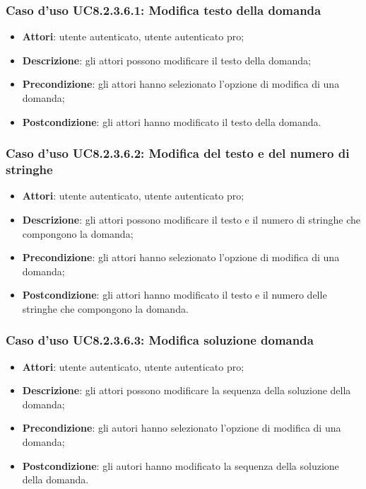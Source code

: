 \subsubsection{Caso d'uso UC8.2.3.6.1: Modifica testo della domanda}
\begin{itemize}
	\item \textbf{Attori}: utente autenticato, utente autenticato pro;
	\item \textbf{Descrizione}: gli attori possono modificare il testo della domanda;
	\item \textbf{Precondizione}: gli attori hanno selezionato l'opzione di modifica di una domanda;
	\item \textbf{Postcondizione}: gli attori hanno modificato il testo della domanda.
\end{itemize}

\subsubsection{Caso d'uso UC8.2.3.6.2: Modifica del testo e del numero di stringhe}
\begin{itemize}
	\item \textbf{Attori}: utente autenticato, utente autenticato pro;
	\item \textbf{Descrizione}: gli attori possono modificare il testo e il numero di stringhe che compongono la domanda;
	\item \textbf{Precondizione}: gli attori hanno selezionato l'opzione di modifica di una domanda;
	\item \textbf{Postcondizione}: gli attori hanno modificato il testo e il numero delle stringhe che compongono la domanda.
\end{itemize}

\subsubsection{Caso d'uso UC8.2.3.6.3: Modifica soluzione domanda}
\begin{itemize}
	\item \textbf{Attori}: utente autenticato, utente autenticato pro;
	\item \textbf{Descrizione}: gli attori possono modificare la sequenza della soluzione della domanda;
	\item \textbf{Precondizione}: gli autori hanno selezionato l'opzione di modifica di una domanda;
	\item \textbf{Postcondizione}: gli autori hanno modificato la sequenza della soluzione della domanda. 
\end{itemize}